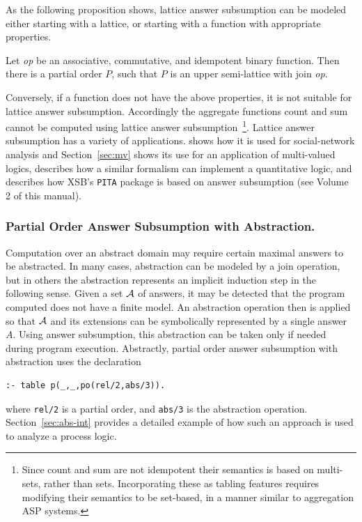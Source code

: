 As the following proposition shows, lattice answer subsumption can be
modeled either starting with a lattice, or starting with a function
with appropriate properties.
\begin{proposition}
Let {\em op} be an associative, commutative, and idempotent binary
function.  Then there is a partial order $P$, such that $P$ is an
upper semi-lattice with join {\em op}.
\end{proposition}
% 
Conversely, if a function does not have the above properties, it is
not suitable for lattice answer subsumption.  Accordingly the
aggregate functions count and sum cannot be computed using lattice
answer subsumption~\footnote{Since count and sum are not idempotent
  their semantics is based on multi-sets, rather than sets.
  Incorporating these as tabling features requires modifying their
  semantics to be set-based, in a manner similar to aggregation ASP
  systems.}.
%
Lattice answer subsumption has a variety of applications.
\cite{SwiW10a} shows how it is used for social-network analysis and
Section~\ref{sec:mv} shows its use for an application of multi-valued
logics, \cite{Swif99a} describes how a similar formalism can implement
a quantitative logic, and \cite{RigS10} describes how XSB's {\tt PITA}
package is based on answer subsumption (see Volume 2 of this manual).

\subsubsection{Partial Order Answer Subsumption with Abstraction.}
Computation over an abstract domain may require certain maximal
answers to be abstracted.  In many cases, abstraction can be modeled
by a join operation, but in others the abstraction represents an
implicit induction step in the following sense. Given a set ${\cal A}$ of
answers, it may be detected that the program computed does not have a
finite model.  An abstraction operation then is applied so that ${\cal A}$
and its extensions can be symbolically represented by a single answer
$A$.  Using answer subsumption, this abstraction can be taken only if
needed during program execution.  Abstractly, partial order answer
subsumption with abstraction uses the declaration {\small
\begin{verbatim}
:- table p(_,_,po(rel/2,abs/3)).
\end{verbatim}
} 
%
\noindent
where {\tt rel/2} is a partial order, and {\tt abs/3} is the
abstraction operation.  Section~\ref{sec:abs-int} provides a detailed
example of how such an approach is used to analyze a process logic.

